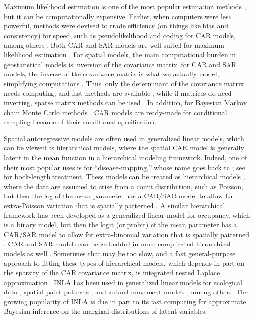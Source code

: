 Maximum likelihood estimation is one of the most popular estimation methods \citep{Cres:stat:1993}, but it can be computationally expensive. Earlier, when computers were less powerful, methods were devised to trade efficiency (on things like bias and consistency) for speed, such as pseudolikelihood \citep{Besa:stat:1975} and coding \citep{Besa:spat:1974} for CAR models, among others \citep{Cres:stat:1993}.  Both CAR and SAR models are well-suited for maximum likelihood estimation \citep{Bane:Carl:Gelf:hier:2014}. For spatial models, the main computational burden in geostatistical models is inversion of the covariance matrix; for CAR and SAR models, the inverse of the covariance matrix is what we actually model, simplifying computations \citep{Paci:spat:2013}.  Thus, only the determinant of the covariance matrix needs computing, and fast methods are available \citep{ Pace:Barr:fast:1997, Pace:Barr:spar:1997}, while if matrices do need inverting, sparse matrix methods can be used \citep{Rue:Held:Gaus:2005}. In addition, for Bayesian Markov chain Monte Carlo methods \citep[MCMC;][]{Gelf:Smit:samp:1990}, CAR models are ready-made for conditional sampling because of their conditional specification.

Spatial autoregressive models are often used in generalized linear models, which can be viewed as hierarchical models, where the spatial CAR model is generally latent in the mean function in a hierarchical modeling framework. Indeed, one of their most popular uses is for ``disease-mapping,'' whose name goes back to \citet{Clay:Kald:empi:1987}; see \citet{Laws:Baye:2009} for book-length treatment.  These models can be treated as hierarchical models \citep{Cres:Cald:Clar:VerH:acco:2009}, where the data are assumed to arise from a count distribution, such as Poisson, but then the log of the mean parameter has a CAR/SAR model to allow for extra-Poisson variation that is spatially patterned \citep[e.g.,][]{Ver:Jans:spac:2007}.  A similar hierarchical framework has been developed as a generalized linear model for occupancy, which is a binary model, but then the logit (or probit) of the mean parameter has a CAR/SAR model to allow for extra-binomial variation that is spatially patterned \citep{Mago:Ray:John:Valk:Daws:Bowm:mode:2007,Gard:Lawl:Ver:Mago:Kell:coar:2010,John:Conn:Hoot:Ray:Pond:spat:2013,Brom:John:Altw:Conq:spat:2014,Pole:Pond:Scha:Brow:Ray:John:occu:2014}.  CAR and SAR models can be embedded in more complicated hierarchical models as well \citep[e.g.,][]{Ver:Came:Bove:Lond:spat:2014}. Sometimes that may be too slow, and a fast general-purpose approach to fitting these types of hierarchical models, which depends in part on the sparsity of the CAR covariance matrix, is integrated nested Laplace approximation \citep[INLA,][]{Rue:Mart:Chop:appr:2009}. INLA has been used in generalized linear models for ecological data \citep[e.g.,][]{Haas:Hoot:Rizz:Meen:fore:2011,Aart:Fieb:Bras:Matt:quan:2013}, spatial point patterns \citep{Illi:Mart:Sorb:Gall:Zunz:Esqu:Trav:fitt:2013}, and animal movement models \citep{John:Hoot:Kuhn:esti:2013}, among others. The growing popularity of INLA is due in part to its fast computing for approximate Bayesian inference on the marginal distributions of latent variables.



